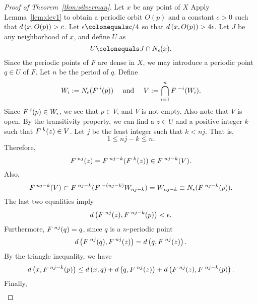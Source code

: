 \documentclass[10pt,draft,twoside]{book}
\begin{document}
\begin{proof}[Proof of Theorem~\ref{thm:silverman}]
  Let $x$ be any point of $X$
  Apply Lemma~\ref{lem:dev1} to obtain a periodic orbit $O(p)$ and a constant $c > 0$ such that $d\left( x, O(p) \right) > c$.
  Let $\epsilon \ceq c/4$ so that $d\left( x, O(p) \right) > 4\epsilon$.
  Let $J$ be any neighborhood of $x$, and define $U$ as
  \begin{equation*}
    U \ceq J \cap \oball{\epsilon}{x}.
  \end{equation*}
  Since the periodic points of $F$ are dense in $X$, we may introduce a periodic point
  $q \in U$ of $F$.
  Let $n$ be the period of $q$.
  Define
  \begin{equation*}
    W_i := N_{\epsilon}(F^{\;i}(p)) \quad\text{ and }\quad V := \bigcap\limits_{i = 1}^{n} F^{\;-i}(W_i).
  \end{equation*}
  Since $F^{\;i}(p) \in W_i$, we see that $p \in V$, and $V$ is not empty. 
  Also note that $V$ is open.
  By the transitivity property, we can find a $z\in U$ and a positive integer $k$ such that
  $F^{\;k}(z) \in V$. Let $j$ be the least integer such that $k < nj$. 
  That is,
  \begin{equation*}
    1 \leq nj - k \leq n.
  \end{equation*}
  Therefore,
  \begin{equation*}
    F^{\;nj} (z) = F^{\;nj - k} (F^{\;k}(z)) \in F^{\;nj-k}(V).
  \end{equation*}
  Also,
  \begin{equation*}
    F^{\;nj - k}(V) \subset F^{\;nj - k}(F^{\;-(nj - k)} W_{nj-k}) 
    = W_{nj-k}
    \equiv N_{\epsilon}(F^{\;nj-k}(p)).
  \end{equation*}
  The last two equalities imply
  \begin{equation*}
    d\left( F^{\;nj}(z), F^{\;nj - k}(p) \right) < \epsilon.
  \end{equation*}
  Furthermore, $F^{\;nj}(q) = q$, since $q$ is a $n$-periodic point 
  \begin{equation*}
    d\left( F^{\;nj}(q), F^{\;nj}(z) \right) = d\left( q, F^{\;nj}(z) \right).
  \end{equation*}
  By the triangle inequality, we have
  \begin{equation*}
    d\left( x, F^{\;nj-k}(p) \right) \leq d\left( x,q \right) + d\left( q, F^{\;nj}(z) \right) + d\left( F^{\;nj}(z), F^{\;nj - k}(p) \right).
  \end{equation*}
  Finally, 
  \begin{align*}

\end{align*}
\end{proof}
\end{document}
